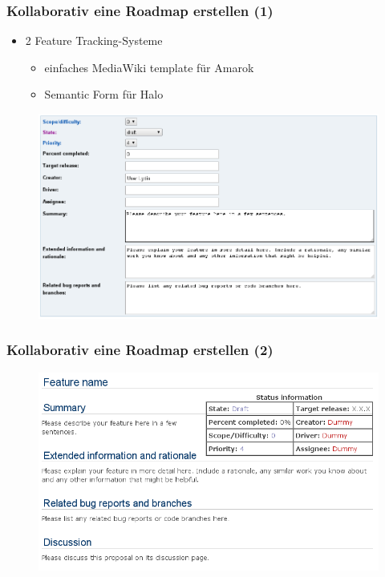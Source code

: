 \documentclass{beamer}
\begin{document}
\begin{frame}
\frametitle{Kollaborativ eine Roadmap erstellen (1)}
\begin{itemize}
 \item 2 Feature Tracking-Systeme
 \begin{itemize}
   \item einfaches MediaWiki template f\"ur Amarok
   \item Semantic Form f\"ur Halo
 \end{itemize}
\end{itemize}
\begin{figure}
 \includegraphics[scale=0.25,keepaspectratio=true]{./featuretrackingform.png}
\end{figure}
\end{frame}

\begin{frame}
\frametitle{Kollaborativ eine Roadmap erstellen (2)}
\begin{figure}
 \includegraphics[scale=0.45,keepaspectratio=true]{./FeatureProposalTemplateAmarok.png}
\end{figure}
\end{frame}
\end{document}
